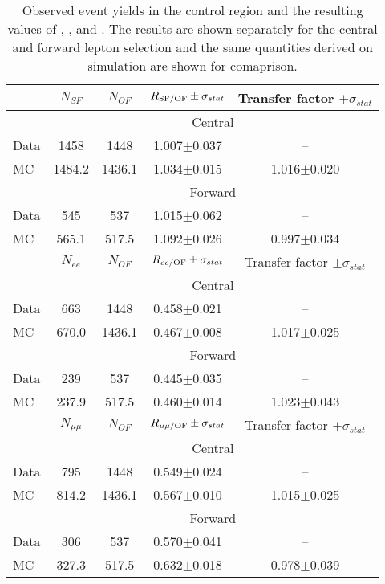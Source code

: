 
\begin{table}[hbtp]
 \renewcommand{\arraystretch}{1.3}
 \setlength{\belowcaptionskip}{6pt}
 \centering
 \caption{Observed event yields in the control region and the resulting values of \Rsfof, \Reeof, and \Rmmof. The results are shown separately for the central and forward lepton selection and the same quantities derived on simulation are shown for comaprison.}
  \label{tab:rSFOF}
\begin{tabular}{l|c|c|c|c}     
 & $N_{SF}$ & $N_{OF}$ & $ R_{\text{SF/OF}} \pm \sigma_{stat}$ & Transfer factor $\pm \sigma_{stat}$  \\    
\hline
&  \multicolumn{4}{c}{Central} \\
\hline
 Data & 1458 & 1448 & 1.007$\pm$0.037 & -- \\
 MC & 1484.2 & 1436.1 & 1.034$\pm$0.015 & 1.016$\pm$0.020\\
 
 
    \hline 
& \multicolumn{4}{c}{Forward} \\
\hline
 Data & 545 & 537 & 1.015$\pm$0.062 & -- \\
 MC & 565.1 & 517.5 & 1.092$\pm$0.026 & 0.997$\pm$0.034\\

\hline\hline
 & $N_{ee}$ & $N_{OF}$ & $ R_\text{$ee$/OF} \pm \sigma_{stat}$ & Transfer factor $\pm \sigma_{stat}$  \\    
\hline
&  \multicolumn{4}{c}{Central} \\
\hline
 Data & 663 & 1448 & 0.458$\pm$0.021 & -- \\
 MC & 670.0 & 1436.1 & 0.467$\pm$0.008 & 1.017$\pm$0.025\\
 
 
    \hline 
& \multicolumn{4}{c}{Forward} \\
\hline
 Data & 239 & 537 & 0.445$\pm$0.035 & -- \\
 MC & 237.9 & 517.5 & 0.460$\pm$0.014 & 1.023$\pm$0.043\\

\hline\hline
 & $N_{\mu\mu}$ & $N_{OF}$ & $ R_\text{$\mu\mu$/OF} \pm \sigma_{stat}$ & Transfer factor $\pm \sigma_{stat}$  \\    
\hline
& \multicolumn{4}{c}{Central} \\
\hline
 Data & 795 & 1448 & 0.549$\pm$0.024 & -- \\
 MC & 814.2 & 1436.1 & 0.567$\pm$0.010 & 1.015$\pm$0.025\\
 
 
    \hline 
 & \multicolumn{4}{c}{Forward} \\
\hline
 Data & 306 & 537 & 0.570$\pm$0.041 & -- \\
 MC & 327.3 & 517.5 & 0.632$\pm$0.018 & 0.978$\pm$0.039\\

  
\end{tabular}  
\end{table}
